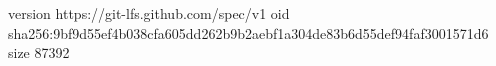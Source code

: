 version https://git-lfs.github.com/spec/v1
oid sha256:9bf9d55ef4b038cfa605dd262b9b2aebf1a304de83b6d55def94faf3001571d6
size 87392
